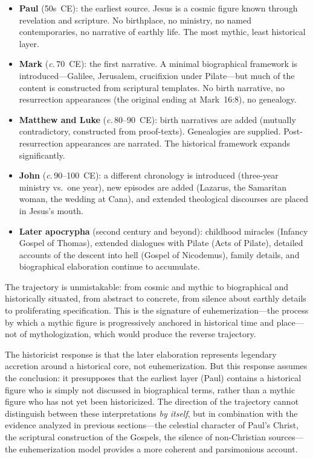 \documentclass[12pt,oneside]{article}
\newcommand{\circa}{\textit{c.}\,}
\begin{document}
\begin{itemize}[leftmargin=2em]
\item \textbf{Paul} (50s~CE): the earliest source.  Jesus is a cosmic
figure known through revelation and scripture.  No birthplace, no
ministry, no named contemporaries, no narrative of earthly life.  The
most mythic, least historical layer.

\item \textbf{Mark} (\circa 70~CE): the first narrative.  A minimal
biographical framework is introduced---Galilee, Jerusalem, crucifixion
under Pilate---but much of the content is constructed from scriptural
templates.  No birth narrative, no resurrection appearances (the
original ending at Mark~16:8), no genealogy.

\item \textbf{Matthew and Luke} (\circa 80--90~CE): birth narratives
are added (mutually contradictory, constructed from proof-texts).
Genealogies are supplied.  Post-resurrection appearances are narrated.
The historical framework expands significantly.

\item \textbf{John} (\circa 90--100~CE): a different chronology is
introduced (three-year ministry vs.\ one year), new episodes are added
(Lazarus, the Samaritan woman, the wedding at Cana), and extended
theological discourses are placed in Jesus's mouth.

\item \textbf{Later apocrypha} (second century and beyond): childhood
miracles (Infancy Gospel of Thomas), extended dialogues with Pilate
(Acts of Pilate), detailed accounts of the descent into hell (Gospel
of Nicodemus), family details, and biographical elaboration continue
to accumulate.
\end{itemize}

The trajectory is unmistakable: from cosmic and mythic to biographical
and historically situated, from abstract to concrete, from silence about
earthly details to proliferating specification.  This is the signature
of euhemerization---the process by which a mythic figure is
progressively anchored in historical time and place---not of
mythologization, which would produce the reverse trajectory.

The historicist response is that the later elaboration represents
legendary accretion around a historical core, not euhemerization.  But
this response assumes the conclusion: it presupposes that the earliest
layer (Paul) contains a historical figure who is simply not discussed
in biographical terms, rather than a mythic figure who has not yet
been historicized.  The direction of the trajectory cannot distinguish
between these interpretations \textit{by itself}, but in combination
with the evidence analyzed in previous sections---the celestial
character of Paul's Christ, the scriptural construction of the Gospels,
the silence of non-Christian sources---the euhemerization model provides
a more coherent and parsimonious account.
\end{document}
